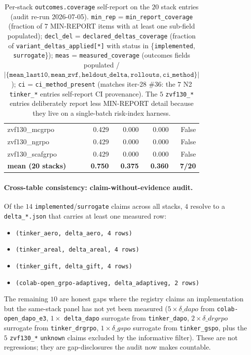 \begin{table}[h]
\begin{tabular}{lrrrr}
zvf130\_mcgrpo                      & 0.429 & 0.000 & 0.000 & False \\
zvf130\_ngrpo                       & 0.429 & 0.000 & 0.000 & False \\
zvf130\_scafgrpo                    & 0.429 & 0.000 & 0.000 & False \\
\midrule
\textbf{mean (20 stacks)} & \textbf{0.750} & \textbf{0.375} & \textbf{0.360} & \textbf{7/20} \\
\bottomrule
\end{tabular}
\caption{Per-stack \texttt{outcomes.coverage} self-report on the $20$
stack entries (audit re-run 2026-07-05). \texttt{min\_rep} =
\texttt{min\_report\_coverage} (fraction of $7$ MIN-REPORT items with
at least one sub-field populated); \texttt{decl\_del} =
\texttt{declared\_deltas\_coverage} (fraction of
\texttt{variant\_deltas\_applied[*]} with status in
\{\texttt{implemented}, \texttt{surrogate}\}); \texttt{meas} =
\texttt{measured\_coverage} (outcomes fields populated /
$\lvert\{\texttt{mean\_last10}, \texttt{mean\_zvf}, \texttt{heldout\_delta},
\texttt{rollouts}, \texttt{ci\_method}\}\rvert$); \texttt{ci} =
\texttt{ci\_method\_present} (matches iter-28 \#36: the $7$ N2
\texttt{tinker\_*} entries self-report CI provenance). The $5$
\texttt{zvf130\_*} entries deliberately report less MIN-REPORT
detail because they live on a single-batch risk-index harness.}
\label{tab:p6-outcomes-coverage}
\end{table}

\paragraph{Cross-table consistency: claim-without-evidence audit.}
Of the $14$ \texttt{implemented}/\texttt{surrogate} claims across all
stacks, $4$ resolve to a \texttt{delta\_*.json} that carries at
least one measured row:
\begin{itemize}
  \item \texttt{(tinker\_aero, delta\_aero, 4 rows)}
  \item \texttt{(tinker\_areal, delta\_areal, 4 rows)}
  \item \texttt{(tinker\_gift, delta\_gift, 4 rows)}
  \item \texttt{(colab-open\_grpo-adaptiveg, delta\_adaptiveg, 2 rows)}
\end{itemize}
The remaining $10$ are honest gaps where the registry claims an
implementation but the same-stack panel has not yet been measured
($5\times\delta\_dapo$ from \texttt{colab-open\_dapo\_e3}, $1\times$
\texttt{delta\_dapo} surrogate from \texttt{tinker\_dapo},
$2\times\delta\_drgrpo$ surrogate from \texttt{tinker\_drgrpo},
$1\times\delta\_gspo$ surrogate from \texttt{tinker\_gspo}, plus the
$5$ \texttt{zvf130\_*} \texttt{unknown} claims excluded by the
informative filter). These are not regressions; they are
gap-disclosures the audit now makes countable.

